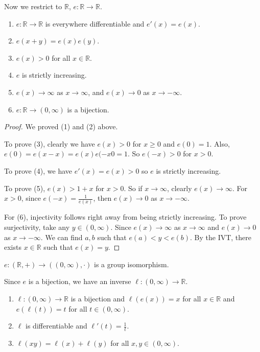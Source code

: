 Now we restrict to \(\mathbb{R}\), \(e: \mathbb{R} \to \mathbb{R}\).
\begin{theorem}
    \leavevmode
    \begin{enumerate}
        \item \(e: \mathbb{R}\to \mathbb{R}\) is everywhere differentiable and \(e'(x) = e(x)\).
        \item \(e(x + y) = e(x) e(y)\).
        \item \(e(x) > 0\) for all \(x \in \mathbb{R}\).
        \item \(e\) is strictly increasing.
        \item \(e(x) \to \infty\) as \(x \to \infty \), and \(e(x) \to 0\) as \(x \to -\infty \).
        \item \(e: \mathbb{R} \to (0, \infty )\) is a bijection.
    \end{enumerate}
\end{theorem}
\begin{proof}
    We proved (1) and (2) above.

    To prove (3), clearly we have \(e(x) > 0\) for \(x \geq 0\) and \(e(0) = 1\). Also, \(e(0) = e(x - x) = e(x) e(-x0 = 1\). So \(e(-x) > 0\) for \(x > 0\).

    To prove (4), we have \(e'(x) = e(x) > 0\) so \(e\) is strictly increasing.
    
    To prove (5), \(e(x) > 1 + x\) for \(x > 0\). So if \(x \to \infty \), clearly \(e(x) \to \infty \). For \(x > 0\), since \(e(-x) = \frac{1}{e(x)}\), then \(e(x) \to 0\) as \(x \to -\infty \).
    
    For (6), injectivity follows right away from being strictly increasing. To prove surjectivity, take any \(y \in (0, \infty)\). Since \(e(x) \to \infty\) as \(x \to \infty \) and \(e(x) \to 0\) as \(x \to -\infty \). We can find \(a, b\) such that \(e(a) < y < e(b)\). By the IVT, there exists \(x \in \mathbb{R}\) such that \(e(x) = y\).
\end{proof}
\begin{remark}
    \(e: (\mathbb{R}, +) \to ((0, \infty), \cdot)\) is a group isomorphism.
\end{remark}
Since \(e\) is a bijection, we have an inverse \(\ell: (0, \infty) \to \mathbb{R}\).
\begin{theorem}
   \leavevmode
   \begin{enumerate}
       \item \(\ell: (0, \infty) \to \mathbb{R}\) is a bijection and \(\ell(e(x)) = x\) for all \(x \in \mathbb{R}\) and \(e(\ell(t)) = t\) for all \(t \in (0, \infty)\).
       \item \(\ell\) is differentiable and \(\ell'(t) = \frac{1}{t}\).
       \item \(\ell(xy) = \ell(x) + \ell(y)\) for all \(x, y \in (0, \infty)\).
   \end{enumerate} 
\end{theorem}
